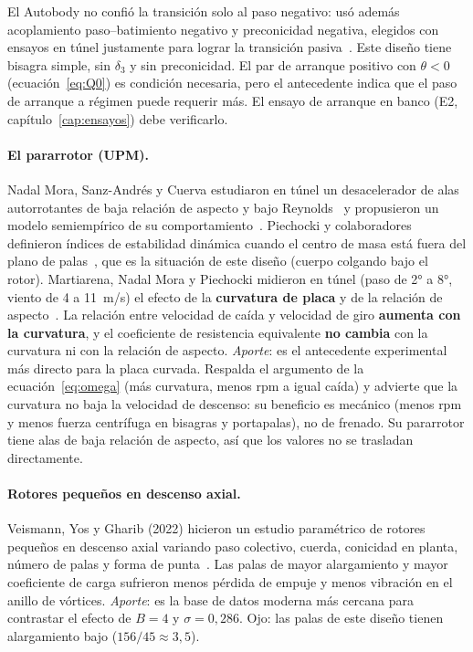 \begin{nota}
El Autobody no confió la transición solo al paso negativo: usó además acoplamiento
paso--batimiento negativo y preconicidad negativa, elegidos con ensayos en túnel
justamente para lograr la transición pasiva~\cite{literatura-brindejonc2007}. Este
diseño tiene bisagra simple, sin $\delta_3$ y sin preconicidad. El par de arranque
positivo con $\theta<0$ (ecuación~\eqref{eq:Q0}) es condición necesaria, pero el
antecedente indica que el paso de arranque a régimen puede requerir más. El ensayo de
arranque en banco (E2, capítulo~\ref{cap:ensayos}) debe verificarlo.
\end{nota}

\paragraph{El pararrotor (UPM).} Nadal Mora, Sanz-Andrés y Cuerva estudiaron en túnel un
desacelerador de alas autorrotantes de baja relación de aspecto y bajo
Reynolds~\cite{literatura-nadal2005} y propusieron un modelo semiempírico de su
comportamiento~\cite{literatura-nadal2006}. Piechocki y colaboradores definieron índices
de estabilidad dinámica cuando el centro de masa está fuera del plano de
palas~\cite{literatura-piechocki2014}, que es la situación de este diseño (cuerpo
colgando bajo el rotor). Martiarena, Nadal Mora y Piechocki midieron en túnel (paso de
\ang{2} a \ang{8}, viento de 4 a \SI{11}{m/s}) el efecto de la \textbf{curvatura de
placa} y de la relación de aspecto~\cite{literatura-martiarena2015}. La relación entre
velocidad de caída y velocidad de giro \textbf{aumenta con la curvatura}, y el
coeficiente de resistencia equivalente \textbf{no cambia} con la curvatura ni con la
relación de aspecto. \emph{Aporte}: es el antecedente experimental más directo para la
placa curvada. Respalda el argumento de la ecuación~\eqref{eq:omega} (más curvatura,
menos rpm a igual caída) y advierte que la curvatura no baja la velocidad de descenso:
su beneficio es mecánico (menos rpm y menos fuerza centrífuga en bisagras y
portapalas), no de frenado. Su
pararrotor tiene alas de baja relación de aspecto, así que los valores no se trasladan
directamente.

\paragraph{Rotores pequeños en descenso axial.} Veismann, Yos y Gharib (2022) hicieron un
estudio paramétrico de rotores pequeños en descenso axial variando paso colectivo,
cuerda, conicidad en planta, número de palas y forma de
punta~\cite{literatura-veismann2022}. Las palas de mayor alargamiento y mayor
coeficiente de carga sufrieron menos pérdida de empuje y menos vibración en el anillo de
vórtices. \emph{Aporte}: es la base de datos moderna más cercana para contrastar el
efecto de $B=4$ y $\sigma=0{,}286$. Ojo: las palas de este diseño tienen alargamiento
bajo ($156/45\approx3{,}5$).

